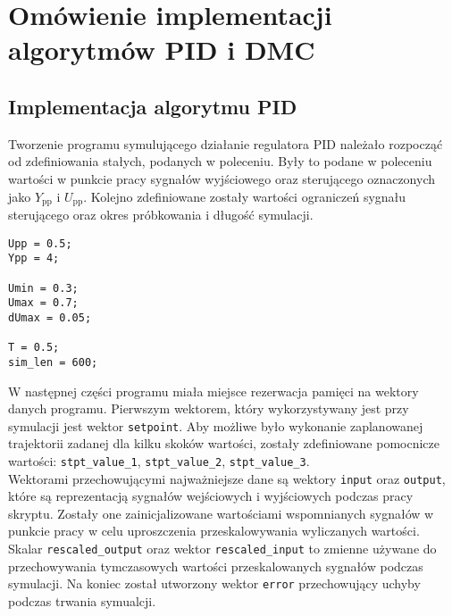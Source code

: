 

\chapter{Omówienie implementacji algorytmów PID i DMC}
\label{zad4}

\section{Implementacja algorytmu PID}
\label{zad4_pid}
Tworzenie programu symulującego działanie regulatora PID należało rozpocząć od zdefiniowania stałych, podanych w poleceniu. Były to podane w poleceniu wartości w punkcie pracy sygnałów wyjściowego oraz sterującego oznaczonych jako $Y_{\mathrm{pp}}$ i $U_{\mathrm{pp}}$. Kolejno zdefiniowane zostały wartości ograniczeń sygnału sterującego oraz okres próbkowania i długość symulacji.
\\ 

\begin{lstlisting}[style=custommatlab,frame=single,label={zad4_const_lst},caption={Definicja stałych wartości używanych w programie},captionpos=b]
Upp = 0.5;
Ypp = 4;

Umin = 0.3;
Umax = 0.7;
dUmax = 0.05;

T = 0.5;   
sim_len = 600;
\end{lstlisting}


W następnej części programu miała miejsce rezerwacja pamięci na wektory danych programu. Pierwszym wektorem, który wykorzystywany jest przy symulacji jest wektor \verb+setpoint+. Aby możliwe było wykonanie zaplanowanej trajektorii zadanej dla kilku skoków wartości, zostały zdefiniowane pomocnicze wartości: \verb+stpt_value_1+, \verb+stpt_value_2+, \verb+stpt_value_3+.\\
\indent{} Wektorami przechowującymi najważniejsze dane są wektory \verb+input+ oraz \verb+output+, które są reprezentacją sygnałów wejściowych i wyjściowych podczas pracy skryptu. Zostały one zainicjalizowane wartościami wspomnianych sygnałów w punkcie pracy w celu uproszczenia przeskalowywania wyliczanych wartości.\\ 
\indent{} Skalar \verb+rescaled_output+ oraz wektor \verb+rescaled_input+ to zmienne używane do przechowywania tymczasowych wartości przeskalowanych sygnałów podczas symulacji. Na koniec został utworzony wektor \verb+error+ przechowujący uchyby podczas trwania symualcji.

